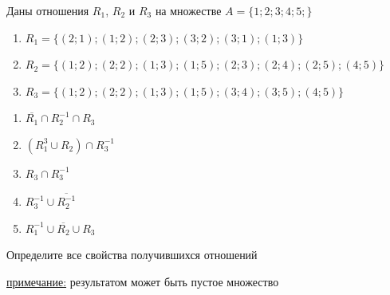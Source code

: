\question
Даны отношения $R_1$, $R_2$ и $R_3$ на множестве $A = \{1; 2; 3; 4; 5;\}$ 
\begin{enumerate}
	\renewcommand{\labelenumi}{\alph{enumi})}
	\item $R_1 = \{(2; 1); (1; 2); (2; 3); (3; 2); (3; 1); (1; 3)\}$
	\item $R_2 = \{(1; 2); (2; 2); (1; 3); (1; 5); (2; 3); (2; 4); (2; 5); (4; 5)\}$
	\item $R_3 = \{(1; 2); (2; 2); (1; 3); (1; 5); (3; 4); (3; 5); (4; 5)\}$
\end{enumerate}

\begin{enumerate}
	\renewcommand{\labelenumi}{\alph{enumi})}
	\item $\overline{R_1} \cap R_2^{-1} \cap R_3$
	\item $(R_1^3 \cup R_2) \cap R_3^{-1}$
	\item $R_3 \cap R_3^{-1}$
	\item $R_3^{-1} \cup \overline{R_2^{-1}}$
	\item $R_1^{-1} \cup \overline{R_2} \cup R_3$
\end{enumerate}

Определите все свойства получившихся отношений

\underline{примечание:} результатом может быть пустое множество